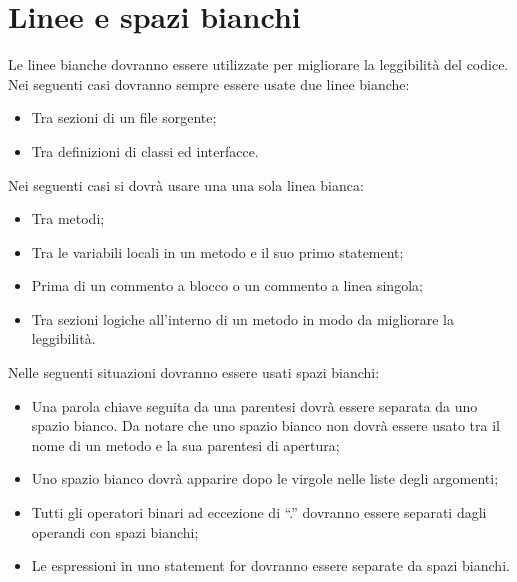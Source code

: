 \documentclass[11pt,titlepage,a4paper]{report}
\begin{document}
\chapter{Linee e spazi bianchi}
Le linee bianche dovranno essere utilizzate per migliorare la leggibilit\`a del codice. Nei seguenti casi dovranno sempre essere usate due linee bianche:
\begin{itemize}
\item Tra sezioni di un file sorgente;
\item Tra definizioni di classi ed interfacce.
\end{itemize}
Nei seguenti casi si dovr\`a usare una una sola linea bianca:
\begin{itemize}
\item Tra metodi;
\item Tra le variabili locali in un metodo e il suo primo statement;
\item Prima di un commento a blocco o un commento a linea singola;
\item Tra sezioni logiche all'interno di un metodo in modo da migliorare la leggibilità.
\end{itemize}
Nelle seguenti situazioni dovranno essere usati spazi bianchi:
\begin{itemize}
\item Una parola chiave seguita da una parentesi dovr\`a essere separata da uno spazio bianco. Da notare che uno spazio bianco non dovr\`a essere usato tra il nome di un metodo e la sua parentesi di apertura;
\item Uno spazio bianco dovr\`a apparire dopo le virgole nelle liste degli argomenti;
\item Tutti gli operatori binari ad eccezione di “.” dovranno essere separati dagli operandi con spazi bianchi;
\item Le espressioni in uno statement for dovranno essere separate da spazi bianchi.
\end{itemize}
\end{document}
